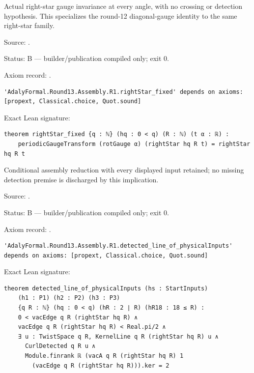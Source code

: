 \begin{theorem}[bp-560]
\label{bp-560}
\leanok
Actual right-star gauge invariance at every angle, with no crossing or detection hypothesis. This specializes the round-12 diagonal-gauge identity to the same right-star family.

\par Source: \texttt{}.
\par Status: B — builder/publication compiled only; exit 0.
\par Axiom record: \texttt{}.
\begin{verbatim}
'AdalyFormal.Round13.Assembly.R1.rightStar_fixed' depends on axioms: [propext, Classical.choice, Quot.sound]
\end{verbatim}
\par Exact Lean signature:
\begin{verbatim}
theorem rightStar_fixed {q : ℕ} (hq : 0 < q) (R : ℕ) (t α : ℝ) :
    periodicGaugeTransform (rotGauge α) (rightStar hq R t) = rightStar hq R t
\end{verbatim}
\end{theorem}

\begin{theorem}[bp-561]
\label{bp-561}
\leanok
Conditional assembly reduction with every displayed input retained; no missing detection premise is discharged by this implication.

\par Source: \texttt{}.
\par Status: B — builder/publication compiled only; exit 0.
\par Axiom record: \texttt{}.
\begin{verbatim}
'AdalyFormal.Round13.Assembly.R1.detected_line_of_physicalInputs' depends on axioms: [propext, Classical.choice, Quot.sound]
\end{verbatim}
\par Exact Lean signature:
\begin{verbatim}
theorem detected_line_of_physicalInputs (hs : StartInputs)
    (h1 : P1) (h2 : P2) (h3 : P3)
    {q R : ℕ} (hq : 0 < q) (hR : 2 ∣ R) (hR18 : 18 ≤ R) :
    0 < vacEdge q R (rightStar hq R) ∧
    vacEdge q R (rightStar hq R) < Real.pi/2 ∧
    ∃ u : TwistSpace q R, KernelLine q R (rightStar hq R) u ∧
      CurlDetected q R u ∧
      Module.finrank ℝ (vacA q R (rightStar hq R) 1
        (vacEdge q R (rightStar hq R))).ker = 2
\end{verbatim}
\end{theorem}

